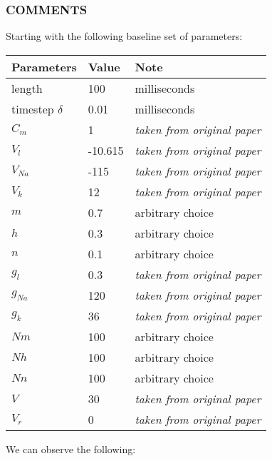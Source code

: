 \documentclass[
]{article}
\begin{document}
\hypertarget{comments}{%
\subsubsection{COMMENTS}\label{comments}}

Starting with the following baseline set of parameters:

\begin{longtable}[]{@{}lll@{}}
\toprule
Parameters & Value & Note \\
\midrule
\endhead
length & 100 & milliseconds \\
timestep \(\delta\) & 0.01 & milliseconds \\
\(C_m\) & 1 & \emph{taken from original paper} \\
\(V_l\) & -10.615 & \emph{taken from original paper} \\
\(V_{Na}\) & -115 & \emph{taken from original paper} \\
\(V_k\) & 12 & \emph{taken from original paper} \\
\(m\) & 0.7 & arbitrary choice \\
\(h\) & 0.3 & arbitrary choice \\
\(n\) & 0.1 & arbitrary choice \\
\(g_l\) & 0.3 & \emph{taken from original paper} \\
\(g_{Na}\) & 120 & \emph{taken from original paper} \\
\(g_k\) & 36 & \emph{taken from original paper} \\
\(Nm\) & 100 & arbitrary choice \\
\(Nh\) & 100 & arbitrary choice \\
\(Nn\) & 100 & arbitrary choice \\
\(V\) & 30 & \emph{taken from original paper} \\
\(V_r\) & 0 & \emph{taken from original paper} \\
\bottomrule
\end{longtable}

We can observe the following:
\end{document}

